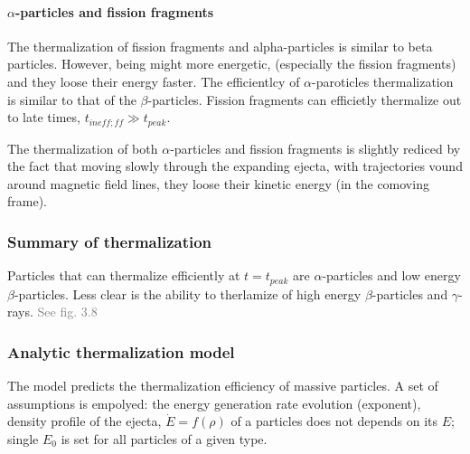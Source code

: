 \documentclass[11pt,a4paper,headinclude=true,DIV=14,BCOR=8mm,chapterprefix,listof=totoc,twoside,openright,abstracton]{scrbook}
\newcommand{\gray}[1]{\textcolor{gray}{#1}}
\begin{document}
\paragraph{$\alpha$-particles and fission fragments}

The thermalization of fission fragments and alpha-particles is similar to beta particles. However, being might more energetic, (especially the fission fragments) and they loose their energy faster. The efficientlcy of $\alpha$-paroticles thermalization is similar to that of the $\beta$-particles. Fission fragments can efficietly thermalize out to late times, $t_{ineff;ff}\gg t_{peak}$.

The thermalization of both $\alpha$-particles and fission fragments is slightly rediced by the fact that moving slowly through the expanding ejecta, with trajectories vound around magnetic field lines, they loose their kinetic energy (in the comoving frame).

\subsubsection{Summary of thermalization}

Particles that can thermalize efficiently at $t=t_{peak}$ are $\alpha$-particles and low energy $\beta$-particles. 
Less clear is the ability to therlamize of high energy $\beta$-particles and $\gamma$-rays. 
\gray{See fig. 3.8}

\subsubsection{Analytic thermalization model}

The model predicts the thermalization efficiency of massive particles. 
A set of assumptions is empolyed: the energy generation rate evolution (exponent), density profile of the ejecta, $\dot{E}=f(\rho)$ of a particles does not depends on its $E$; single $E_0$ is set for all particles of a given type.
\end{document}
